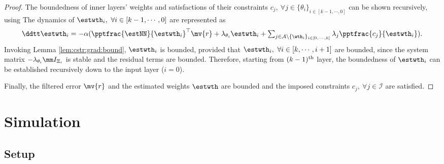 \documentclass[lettersize,journal]{IEEEtran}
\newcommand*{\fe}{\mv{r}}
\begin{document}
\begin{proof}
The boundedness of inner layers' weights and satisfactions of their constraints $c_j,\ \forall j\in\{\theta_i\}_{i\in[k-1,\cdots,0]}$ can be shown recursively, using \cite[Chap.~4 T.~1.9]{Desoer:2009aa}
The dynamics of $\estwth_i,\ \forall i\in[k-1,\cdots,0]$ are represented as
\begin{equation}
    \ddtt \estwth_i 
    =
    -\alpha
    (
        \pptfrac{\estNN}{\estwth_i}^\top
        \fe
        +
        \lambda_{\theta_i}\estwth_i
        +
        \textstyle\sum_{
            j\in\mathcal{A}\setminus \{\wth_i\}_{i\in[0,\cdots,k]}
        }
        \lambda_j
        \pptfrac{c_j}{\estwth_i}
    )
    .
\end{equation}
Invoking Lemma \ref{lem:cstr:grad:bound}, $\estwth_i$ is bounded, provided that $\estwth_i,\ \forall i\in[k,\cdots,i+1]$ are bounded, since the system matrix $-\lambda_{\theta_i} \mm I_{\Xi_i}$ is stable and the residual terms are bounded.
Therefore, starting from $(k-1)\textsuperscript{th}$ layer, the boundedness of $\estwth_i$ can be established recursively down to the input layer ($i=0$).

\hfill

Finally, the filtered error $\fe$ and the estimated weights $\estwth$ are bounded and the imposed constraints $c_j,\ \forall j\in\mathcal I$ are satisfied.

\end{proof}

\section{Simulation}\label{sec:sim}

\subsection{Setup}
\end{document}

